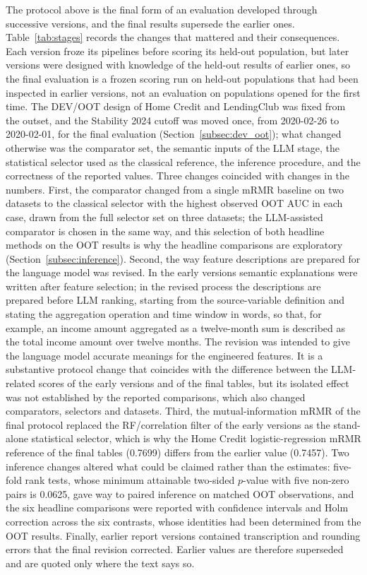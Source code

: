 \documentclass[final,5p,twocolumn]{elsarticle}
\begin{document}
The protocol above is the final form of an evaluation developed through successive versions, and the final results supersede the earlier ones. Table~\ref{tab:stages} records the changes that mattered and their consequences. Each version froze its pipelines before scoring its held-out population, but later versions were designed with knowledge of the held-out results of earlier ones, so the final evaluation is a frozen scoring run on held-out populations that had been inspected in earlier versions, not an evaluation on populations opened for the first time. The DEV/OOT design of Home Credit and LendingClub was fixed from the outset, and the Stability 2024 cutoff was moved once, from 2020-02-26 to 2020-02-01, for the final evaluation (Section~\ref{subsec:dev_oot}); what changed otherwise was the comparator set, the semantic inputs of the LLM stage, the statistical selector used as the classical reference, the inference procedure, and the correctness of the reported values. Three changes coincided with changes in the numbers. First, the comparator changed from a single mRMR baseline on two datasets to the classical selector with the highest observed OOT AUC in each case, drawn from the full selector set on three datasets; the LLM-assisted comparator is chosen in the same way, and this selection of both headline methods on the OOT results is why the headline comparisons are exploratory (Section~\ref{subsec:inference}). Second, the way feature descriptions are prepared for the language model was revised. In the early versions semantic explanations were written after feature selection; in the revised process the descriptions are prepared before LLM ranking, starting from the source-variable definition and stating the aggregation operation and time window in words, so that, for example, an income amount aggregated as a twelve-month sum is described as the total income amount over twelve months. The revision was intended to give the language model accurate meanings for the engineered features. It is a substantive protocol change that coincides with the difference between the LLM-related scores of the early versions and of the final tables, but its isolated effect was not established by the reported comparisons, which also changed comparators, selectors and datasets. Third, the mutual-information mRMR of the final protocol replaced the RF/correlation filter of the early versions as the stand-alone statistical selector, which is why the Home Credit logistic-regression mRMR reference of the final tables (0.7699) differs from the earlier value (0.7457). Two inference changes altered what could be claimed rather than the estimates: five-fold rank tests, whose minimum attainable two-sided $p$-value with five non-zero pairs is 0.0625, gave way to paired inference on matched OOT observations, and the six headline comparisons were reported with confidence intervals and Holm correction across the six contrasts, whose identities had been determined from the OOT results. Finally, earlier report versions contained transcription and rounding errors that the final revision corrected. Earlier values are therefore superseded and are quoted only where the text says so.
\end{document}
